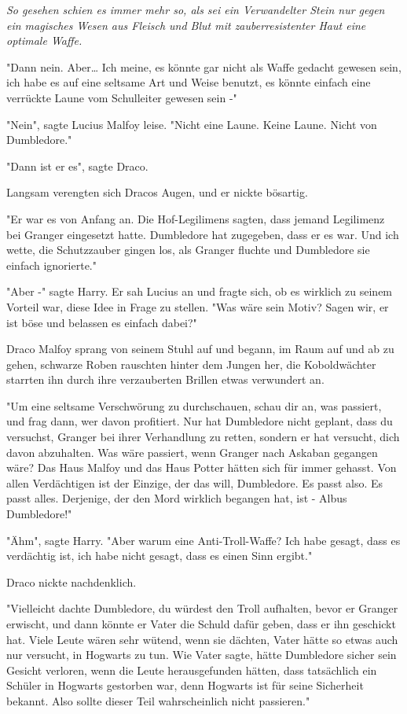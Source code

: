 {\emph{So gesehen schien es immer mehr so, als sei ein Verwandelter Stein nur gegen ein magisches Wesen aus Fleisch und Blut mit zauberresistenter Haut eine optimale Waffe.}

"Dann nein. Aber… Ich meine, es könnte gar nicht als Waffe gedacht gewesen sein, ich habe es auf eine seltsame Art und Weise benutzt, es könnte einfach eine verrückte Laune vom Schulleiter gewesen sein -"

"Nein", sagte Lucius Malfoy leise. "Nicht eine Laune. Keine Laune. Nicht von Dumbledore."

"Dann ist er es", sagte Draco.

Langsam verengten sich Dracos Augen, und er nickte bösartig.

"Er war es von Anfang an. Die Hof-Legilimens sagten, dass jemand Legilimenz bei Granger eingesetzt hatte. Dumbledore hat zugegeben, dass er es war. Und ich wette, die Schutzzauber gingen los, als Granger fluchte und Dumbledore sie einfach ignorierte."

"Aber -" sagte Harry. Er sah Lucius an und fragte sich, ob es wirklich zu seinem Vorteil war, diese Idee in Frage zu stellen. "Was wäre sein Motiv? Sagen wir, er ist böse und belassen es einfach dabei?"

Draco Malfoy sprang von seinem Stuhl auf und begann, im Raum auf und ab zu gehen, schwarze Roben rauschten hinter dem Jungen her, die Koboldwächter starrten ihn durch ihre verzauberten Brillen etwas verwundert an.

"Um eine seltsame Verschwörung zu durchschauen, schau dir an, was passiert, und frag dann, wer davon profitiert. Nur hat Dumbledore nicht geplant, dass du versuchst, Granger bei ihrer Verhandlung zu retten, sondern er hat versucht, dich davon abzuhalten. Was wäre passiert, wenn Granger nach Askaban gegangen wäre? Das Haus Malfoy und das Haus Potter hätten sich für immer gehasst. Von allen Verdächtigen ist der Einzige, der das will, Dumbledore. Es passt also. Es passt alles. Derjenige, der den Mord wirklich begangen hat, ist - Albus Dumbledore!"

"Ähm", sagte Harry. "Aber warum eine Anti-Troll-Waffe? Ich habe gesagt, dass es verdächtig ist, ich habe nicht gesagt, dass es einen Sinn ergibt."

Draco nickte nachdenklich.

"Vielleicht dachte Dumbledore, du würdest den Troll aufhalten, bevor er Granger erwischt, und dann könnte er Vater die Schuld dafür geben, dass er ihn geschickt hat. Viele Leute wären sehr wütend, wenn sie dächten, Vater hätte so etwas auch nur versucht, in Hogwarts zu tun. Wie Vater sagte, hätte Dumbledore sicher sein Gesicht verloren, wenn die Leute herausgefunden hätten, dass tatsächlich ein Schüler in Hogwarts gestorben war, denn Hogwarts ist für seine Sicherheit bekannt. Also sollte dieser Teil wahrscheinlich nicht passieren."

}
